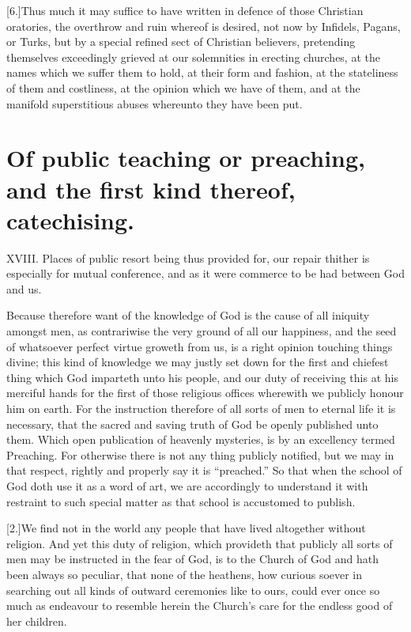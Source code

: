 [6.]Thus much it may suffice to have written in defence of those Christian oratories, the overthrow and ruin whereof is desired, not now by Infidels, Pagans, or Turks, but by a special refined sect of Christian believers, pretending themselves exceedingly grieved at our solemnities in erecting churches, at the names which we suffer them to hold, at their form and fashion, at the stateliness of them and costliness, at the opinion which we have of them, and at the manifold superstitious abuses whereunto they have been put.


\section*{Of public teaching or preaching, and the first kind thereof, catechising.}
XVIII. Places of public resort being thus provided for, our repair thither is especially for mutual conference, and as it were commerce to be had between God and us.

Because therefore want of the knowledge of God is the cause of all iniquity amongst men, as contrariwise the very ground of all our happiness, and the seed of whatsoever  perfect virtue groweth from us,
 is a right opinion touching things divine; this kind of knowledge we may justly set down for the first and chiefest thing which God imparteth unto his people, and our duty of receiving this at his merciful hands for the first of those religious offices wherewith we publicly honour him on earth. For the instruction therefore of all sorts of men to eternal life it is necessary, that the sacred and saving truth of God be openly published unto them. Which open publication of heavenly mysteries, is by an excellency termed Preaching. For otherwise there is not any thing publicly notified, but we may in that respect, rightly and properly say it is “preached.” So that when the school of God doth use it as a word of art, we are accordingly to understand it with restraint to such special matter as that school is accustomed to publish.

[2.]We find not in the world any people that have lived altogether without religion. And yet this duty of religion, which provideth that publicly all sorts of men may be instructed in the fear of God, is to the Church of God and hath been always so peculiar, that none of the heathens, how curious soever in searching out all kinds of outward ceremonies like to ours, could ever once so much as endeavour to resemble herein the Church’s care for the endless good of her children.

